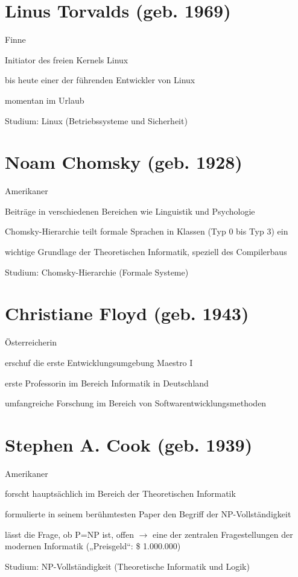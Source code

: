 \documentclass[a4paper,12pt]{scrreprt}
\begin{document}
\section*{Linus Torvalds (geb. 1969)}
\begin{itemize*}
    \item Finne
    \item Initiator des freien Kernels Linux
    \item bis heute einer der führenden Entwickler von Linux
    \item momentan im Urlaub
    \item Studium: Linux (Betriebssysteme und Sicherheit)
\end{itemize*}

\section*{Noam Chomsky (geb. 1928)}
\begin{itemize*}
    \item Amerikaner
    \item Beiträge in verschiedenen Bereichen wie Linguistik und Psychologie
    \item Chomsky-Hierarchie teilt formale Sprachen in Klassen (Typ 0 bis Typ 3) ein
    \item wichtige Grundlage der Theoretischen Informatik, speziell des Compilerbaus
    \item Studium: Chomsky-Hierarchie (Formale Systeme)
\end{itemize*}

\newpage

\section*{Christiane Floyd (geb. 1943)}
\begin{itemize*}
    \item Österreicherin
    \item erschuf die erste Entwicklungsumgebung Maestro I
    \item erste Professorin im Bereich Informatik in Deutschland
    \item umfangreiche Forschung im Bereich von Softwarentwicklungsmethoden
\end{itemize*}

\section*{Stephen A. Cook (geb. 1939)}
\begin{itemize*}
    \item Amerikaner
    \item forscht hauptsächlich im Bereich der Theoretischen Informatik
    \item formulierte in seinem berühmtesten Paper den Begriff der NP-Vollständigkeit
    \item lässt die Frage, ob P=NP ist, offen $\rightarrow$ eine der zentralen Fragestellungen
          der modernen Informatik („Preisgeld“: \$ 1.000.000)
    \item Studium: NP-Vollständigkeit (Theoretische Informatik und Logik)
\end{itemize*}
\end{document}
